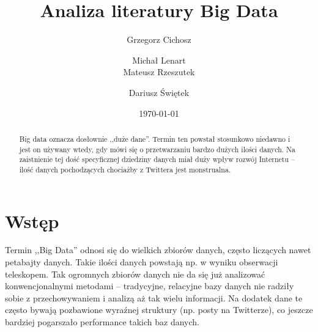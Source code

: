 \documentclass[10pt,twocolumn]{llncs}          %
\begin{document}

\title{Analiza literatury Big Data}

\author{Grzegorz Cichosz \and
    Michał Lenart \\
    Mateusz Rzeszutek \and
    Dariusz Świętek
}


\date{\today}

\maketitle

\renewcommand{\abstractname}{Abstract}
\begin{abstract}
    Big data oznacza dosłownie ,,duże dane''. Termin ten powstał stosunkowo niedawno i jest on używany wtedy, gdy mówi się o przetwarzaniu bardzo dużych ilości danych. Na zaistnienie tej dość specyficznej dziedziny danych miał duży wpływ rozwój Internetu -- ilość danych pochodzących chociażby z Twittera jest monstrualna.
\end{abstract}


%
%

\section{Wstęp}
\label{sec:Wstep}

Termin ,,Big Data'' odnosi się do wielkich zbiorów danych, często liczących nawet petabajty danych. Takie ilości danych powstają np. w wyniku obserwacji teleskopem. Tak ogromnych zbiorów danych nie da się już analizować konwencjonalnymi metodami -- tradycyjne, relacyjne bazy danych nie radziły sobie z przechowywaniem i analizą aż tak wielu informacji. Na dodatek dane te często bywają pozbawione wyraźnej struktury (np. posty na Twitterze), co jeszcze bardziej pogarszało performance takich baz danych.
\end{document}
